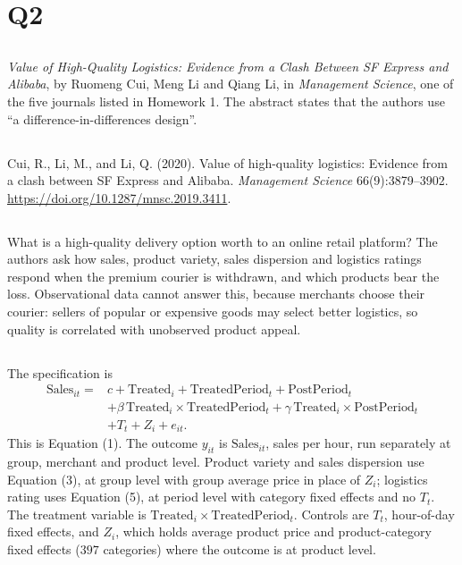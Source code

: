 \documentclass[11pt]{article}
\begin{document}
\clearpage
\section{Q2}
\label{sec:q2}

\subsection{}
\emph{Value of High-Quality Logistics: Evidence from a Clash Between SF Express
and Alibaba}, by Ruomeng Cui, Meng Li and Qiang Li, in \emph{Management
Science}, one of the five journals listed in Homework 1. The abstract states
that the authors use ``a difference-in-differences design''.

\subsection{}
Cui, R., Li, M., and Li, Q. (2020). Value of high-quality logistics: Evidence
from a clash between SF Express and Alibaba. \emph{Management Science}
66(9):3879--3902. \url{https://doi.org/10.1287/mnsc.2019.3411}.

\subsection{}
What is a high-quality delivery option worth to an online retail platform? The
authors ask how sales, product variety, sales dispersion and logistics ratings
respond when the premium courier is withdrawn, and which products bear the
loss. Observational data cannot answer this, because merchants choose their
courier: sellers of popular or expensive goods may select better logistics, so
quality is correlated with unobserved product appeal.

\subsection{}
The specification is
\begin{align*}
\text{Sales}_{it} ={}& c + \text{Treated}_i + \text{TreatedPeriod}_t
  + \text{PostPeriod}_t \\
 &+ \beta\,\text{Treated}_i \times \text{TreatedPeriod}_t
  + \gamma\,\text{Treated}_i \times \text{PostPeriod}_t \\
 &+ T_t + Z_i + e_{it}.
\end{align*}
This is Equation (1). The outcome $y_{it}$ is $\text{Sales}_{it}$, sales per
hour, run separately at group, merchant and product level. Product variety and sales dispersion use Equation (3), at group level
with group average price in place of $Z_i$; logistics rating uses Equation (5),
at period level with category fixed effects and no $T_t$. The treatment
variable is
$\text{Treated}_i \times \text{TreatedPeriod}_t$. Controls are $T_t$,
hour-of-day fixed effects, and $Z_i$, which holds average product price and
product-category fixed effects ($397$ categories) where the outcome is at
product level.
\end{document}
